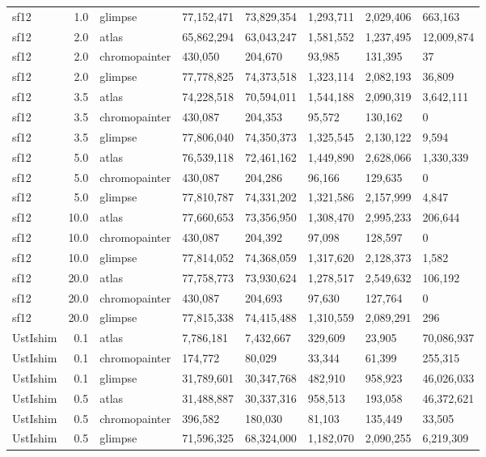 {\begin{longtable}[t]{lrllllll}
sf12 & 1.0 & glimpse & 77,152,471 & 73,829,354 & 1,293,711 & 2,029,406 & 663,163\\
sf12 & 2.0 & atlas & 65,862,294 & 63,043,247 & 1,581,552 & 1,237,495 & 12,009,874\\
sf12 & 2.0 & chromopainter & 430,050 & 204,670 & 93,985 & 131,395 & 37\\
sf12 & 2.0 & glimpse & 77,778,825 & 74,373,518 & 1,323,114 & 2,082,193 & 36,809\\
sf12 & 3.5 & atlas & 74,228,518 & 70,594,011 & 1,544,188 & 2,090,319 & 3,642,111\\
sf12 & 3.5 & chromopainter & 430,087 & 204,353 & 95,572 & 130,162 & 0\\
sf12 & 3.5 & glimpse & 77,806,040 & 74,350,373 & 1,325,545 & 2,130,122 & 9,594\\
sf12 & 5.0 & atlas & 76,539,118 & 72,461,162 & 1,449,890 & 2,628,066 & 1,330,339\\
sf12 & 5.0 & chromopainter & 430,087 & 204,286 & 96,166 & 129,635 & 0\\
sf12 & 5.0 & glimpse & 77,810,787 & 74,331,202 & 1,321,586 & 2,157,999 & 4,847\\
sf12 & 10.0 & atlas & 77,660,653 & 73,356,950 & 1,308,470 & 2,995,233 & 206,644\\
sf12 & 10.0 & chromopainter & 430,087 & 204,392 & 97,098 & 128,597 & 0\\
sf12 & 10.0 & glimpse & 77,814,052 & 74,368,059 & 1,317,620 & 2,128,373 & 1,582\\
sf12 & 20.0 & atlas & 77,758,773 & 73,930,624 & 1,278,517 & 2,549,632 & 106,192\\
sf12 & 20.0 & chromopainter & 430,087 & 204,693 & 97,630 & 127,764 & 0\\
sf12 & 20.0 & glimpse & 77,815,338 & 74,415,488 & 1,310,559 & 2,089,291 & 296\\
UstIshim & 0.1 & atlas & 7,786,181 & 7,432,667 & 329,609 & 23,905 & 70,086,937\\
UstIshim & 0.1 & chromopainter & 174,772 & 80,029 & 33,344 & 61,399 & 255,315\\
UstIshim & 0.1 & glimpse & 31,789,601 & 30,347,768 & 482,910 & 958,923 & 46,026,033\\
UstIshim & 0.5 & atlas & 31,488,887 & 30,337,316 & 958,513 & 193,058 & 46,372,621\\
UstIshim & 0.5 & chromopainter & 396,582 & 180,030 & 81,103 & 135,449 & 33,505\\
UstIshim & 0.5 & glimpse & 71,596,325 & 68,324,000 & 1,182,070 & 2,090,255 & 6,219,309\\

\end{longtable}}
